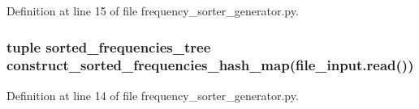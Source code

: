 Definition at line 15 of file frequency\-\_\-sorter\-\_\-generator.\-py.

\hypertarget{namespacefrequency__sorter__generator_a46abc2f5c61db548b0851ad685b29a49}{
\subsubsection[{sorted\-\_\-frequencies\-\_\-tree}]{\setlength{\rightskip}{0pt plus 5cm}tuple sorted\-\_\-frequencies\-\_\-tree {\bf construct\-\_\-sorted\-\_\-frequencies\-\_\-hash\-\_\-map}(file\-\_\-input.\-read())}}\label{namespacefrequency__sorter__generator_a46abc2f5c61db548b0851ad685b29a49}


Definition at line 14 of file frequency\-\_\-sorter\-\_\-generator.\-py.


